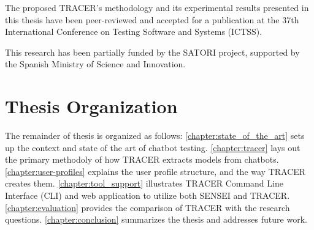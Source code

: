 The proposed \ac{TRACER}'s methodology and its experimental results presented in this thesis
have been peer-reviewed and accepted for a publication at the
37th International Conference on Testing Software and Systems (ICTSS).

This research has been partially funded by the SATORI project, supported by the Spanish Ministry of Science and Innovation.

\section{Thesis Organization}

The remainder of thesis is organized as follows:
\autoref{chapter:state_of_the_art} sets up the context and state of the art of chatbot testing.
\autoref{chapter:tracer} lays out the primary methodoly of how \ac{TRACER} extracts models from chatbots.
\autoref{chapter:user-profiles} explains the user profile structure, and the way \ac{TRACER} creates them.
\autoref{chapter:tool_support} illustrates \ac{TRACER} Command Line Interface (CLI) and web application to utilize both SENSEI and \ac{TRACER}.
\autoref{chapter:evaluation} provides the comparison of \ac{TRACER} with the research questions.
\autoref{chapter:conclusion} summarizes the thesis and addresses future work.
